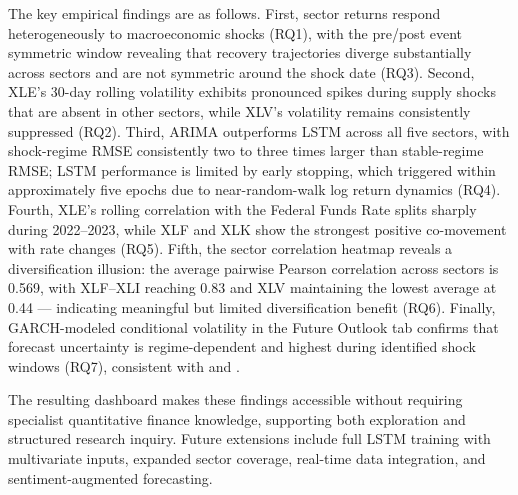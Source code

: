 \documentclass[12pt]{article}
\begin{document}
\hfill

\noindent The key empirical findings are as follows. First, sector returns respond heterogeneously to macroeconomic shocks (RQ1), with the pre/post event symmetric window revealing that recovery trajectories diverge substantially across sectors and are not symmetric around the shock date (RQ3). Second, XLE's 30-day rolling volatility exhibits pronounced spikes during supply shocks that are absent in other sectors, while XLV's volatility remains consistently suppressed (RQ2). Third, ARIMA outperforms LSTM across all five sectors, with shock-regime RMSE consistently two to three times larger than stable-regime RMSE; LSTM performance is limited by early stopping, which triggered within approximately five epochs due to near-random-walk log return dynamics (RQ4). Fourth, XLE's rolling correlation with the Federal Funds Rate splits sharply during 2022--2023, while XLF and XLK show the strongest positive co-movement with rate changes (RQ5). Fifth, the sector correlation heatmap reveals a diversification illusion: the average pairwise Pearson correlation across sectors is 0.569, with XLF--XLI reaching 0.83 and XLV maintaining the lowest average at 0.44 --- indicating meaningful but limited diversification benefit (RQ6). Finally, GARCH-modeled conditional volatility in the Future Outlook tab confirms that forecast uncertainty is regime-dependent and highest during identified shock windows (RQ7), consistent with \cite{ewing2003} and \cite{ewing2002}.

\hfill

\noindent The resulting dashboard makes these findings accessible without requiring specialist quantitative finance knowledge, supporting both exploration and structured research inquiry. Future extensions include full LSTM training with multivariate inputs, expanded sector coverage, real-time data integration, and sentiment-augmented forecasting.

\hfill
\pagebreak
\end{document}
